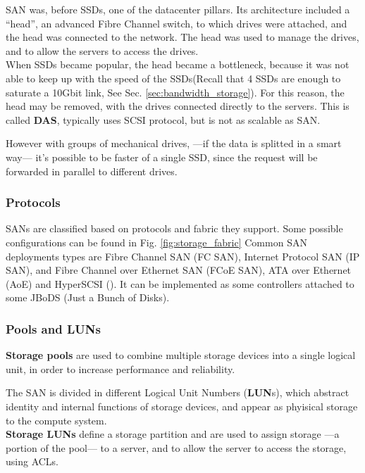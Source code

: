 SAN was, before SSDs, one of the datacenter pillars.
Its architecture included a ``head'', an advanced Fibre Channel switch, to which drives were attached, and the head was connected to the network. The head was used to manage the drives, and to allow the servers to access the drives.\\
When SSDs became popular, the head became a bottleneck, because it was not able to keep up with the speed of the SSDs(Recall that 4 SSDs are enough to saturate a 10Gbit link, See Sec. \ref{sec:bandwidth_storage}). 
For this reason, the head may be removed, with the drives connected directly to the servers. This is called \textbf{DAS}, typically uses SCSI protocol, but is not as scalable as SAN.

However with groups of mechanical drives, ---if the data is splitted in a smart way--- it's possible to be faster of a single SSD, since the request will be forwarded in parallel to different drives.

\subsubsection{Protocols}
SANs are classified based on protocols and fabric they support. Some possible configurations can be found in Fig. \ref{fig:storage_fabric} 
Common SAN deployments types are Fibre Channel SAN (FC SAN), Internet Protocol SAN (IP SAN), and Fibre Channel over Ethernet SAN (FCoE SAN), ATA over Ethernet (AoE) and HyperSCSI ().
It can be implemented as some controllers attached to some JBoDS (Just a Bunch of Disks).



\subsubsection{Pools and LUNs}

\textbf{Storage pools} are used to combine multiple storage devices into a single logical unit, in order to increase performance and reliability. 

The SAN is divided in different Logical Unit Numbers (\textbf{LUN}s), which abstract identity and internal functions of storage devices, and appear as phyisical storage to the compute system.\\
\textbf{Storage LUNs} define a storage partition and are used to assign storage ---a portion of the pool--- to a server, and to allow the server to access the storage, using ACLs.
\nl

